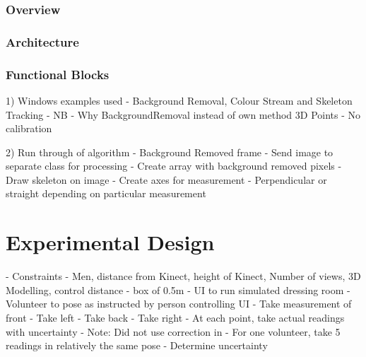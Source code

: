 \subsubsection{Overview}


\subsubsection{Architecture}


\subsubsection{Functional Blocks}

1) Windows examples used - Background Removal, Colour Stream and Skeleton Tracking - NB - Why BackgroundRemoval instead of own method
3D Points - No calibration

2) Run through of algorithm
- Background Removed frame
- Send image to separate class for processing
- Create array with background removed pixels
- Draw skeleton on image
- Create axes for measurement - Perpendicular or straight depending on particular measurement

\section{Experimental Design}
- Constraints - Men, distance from Kinect, height of Kinect, Number of views, 3D Modelling, control distance - box of 0.5m
- UI to run simulated dressing room
- Volunteer to pose as instructed by person controlling UI
- Take measurement of front
- Take left
- Take back
- Take right 
- At each point, take actual readings with uncertainty
- Note: Did not use correction in \cite{nonContact2017}
- For one volunteer, take 5 readings in relatively the same pose - Determine uncertainty 